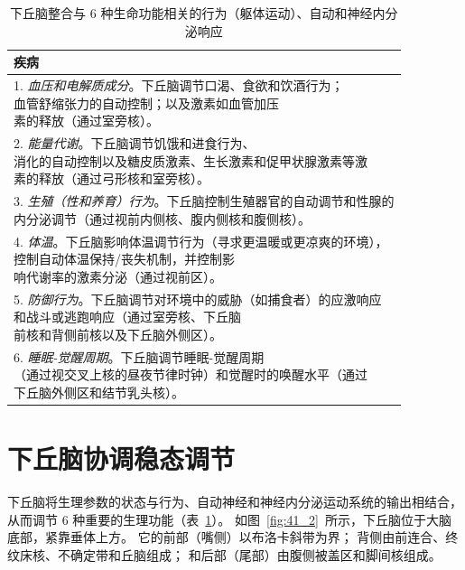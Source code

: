 \begin{table}[htbp]
	\caption{下丘脑整合与 6 种生命功能相关的行为（躯体运动）、自动和神经内分泌响应} \label{tab:41_1} \centering
	\begin{tabular}{l}
		\toprule
		疾病 \\
		\midrule
		\makecell[l]{1. \textit{血压和电解质成分}。下丘脑调节口渴、食欲和饮酒行为；\\血管舒缩张力的自动控制；以及激素如血管加压\\素的释放（通过室旁核）。}  \\
		\makecell[l]{2. \textit{能量代谢}。下丘脑调节饥饿和进食行为、\\消化的自动控制以及糖皮质激素、生长激素和促甲状腺激素等激\\素的释放（通过弓形核和室旁核）。}  \\
		\makecell[l]{3. \textit{生殖（性和养育）行为}。下丘脑控制生殖器官的自动调节和性腺的\\内分泌调节（通过视前内侧核、腹内侧核和腹侧核）。}  \\
		\makecell[l]{4. \textit{体温}。下丘脑影响体温调节行为（寻求更温暖或更凉爽的环境），\\控制自动体温保持/丧失机制，并控制影\\响代谢率的激素分泌（通过视前区）。}  \\
		\makecell[l]{5. \textit{防御行为}。下丘脑调节对环境中的威胁（如捕食者）的应激响应\\和战斗或逃跑响应（通过室旁核、下丘脑\\前核和背侧前核以及下丘脑外侧区）。}  \\
		\makecell[l]{6. \textit{睡眠-觉醒周期}。下丘脑调节睡眠-觉醒周期\\（通过视交叉上核的昼夜节律时钟）和觉醒时的唤醒水平（通过\\下丘脑外侧区和结节乳头核）。}  \\
		\bottomrule
	\end{tabular}
\end{table}

\section{下丘脑协调稳态调节}

下丘脑将生理参数的状态与行为、自动神经和神经内分泌运动系统的输出相结合，从而调节 6 种重要的生理功能（表~\ref{tab:41_1}）。
如图~\ref{fig:41_2}~所示，下丘脑位于大脑底部，紧靠垂体上方。
它的前部（嘴侧）以布洛卡斜带为界；
背侧由前连合、终纹床核、不确定带和丘脑组成；
和后部（尾部）由腹侧被盖区和脚间核组成。



